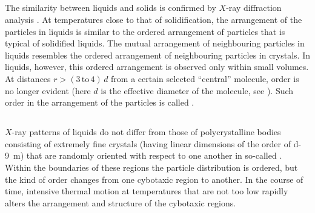 \subsection{}\label{13.1.2} The similarity between liquids and solids is confirmed by $X$-ray diffraction analysis . At temperatures close to that of solidification, the arrangement of the particles in liquids is similar to the ordered arrangement of particles that is typical of solidified liquids. The mutual arrangement of neighbouring particles in liquids resembles the ordered arrangement of neighbouring particles in crystals. In liquids, however, this ordered arrangement is observed only within small volumes. At distances $r > (3 \, \text{to} \, 4) \,d$ from a certain selected ``central'' molecule, order is no longer evident (here $d$ is the effective diameter of the molecule, see ). Such order in the arrangement of the particles is called .

\subsection{}\label{13.1.3} $X$-ray patterns of liquids do not differ from those of polycrystalline bodies  consisting of extremely fine crystals (having linear dimensions of the order of \SI{d-9}{\meter}) that are randomly oriented with respect to one another in so-called . Within the boundaries of these regions the particle distribution is ordered, but the kind of order changes from one cybotaxic region to another. In the course of time, intensive thermal motion at temperatures that are not too low rapidly alters the arrangement and structure of the cybotaxic regions.

